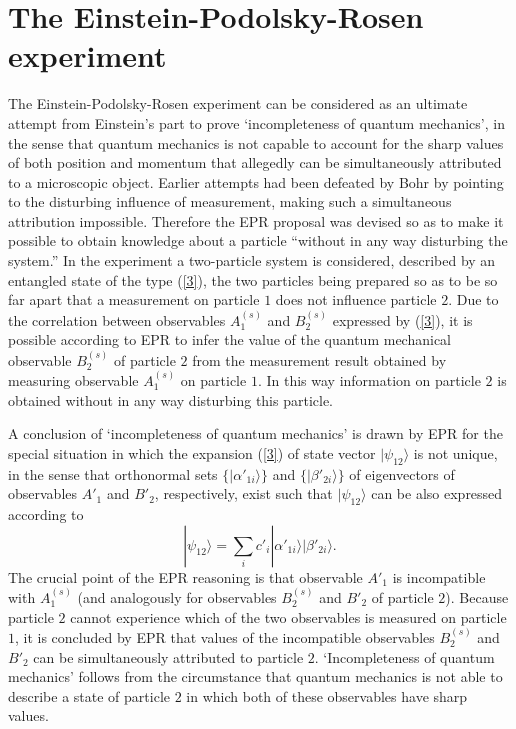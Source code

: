 \documentclass[12pt]{article}
\begin{document}
\section{The Einstein-Podolsky-Rosen experiment} \label{sec2.4}
The Einstein-Podolsky-Rosen experiment \cite{EPR} can be
considered as an ultimate attempt from Einstein's part to prove
`incompleteness of quantum mechanics', in the sense that quantum
mechanics is not capable to account for the sharp values of both
position and momentum that allegedly can be simultaneously
attributed to a microscopic object. Earlier attempts had been
defeated by Bohr by pointing to the disturbing influence of
measurement, making such a simultaneous attribution impossible.
Therefore the EPR proposal was devised so as to make it possible
to obtain knowledge about a particle ``without in any way
disturbing the system.'' In the experiment a two-particle system
is considered, described by an entangled state of the type
(\ref{3}), the two particles being prepared so as to be so far
apart that a measurement on particle $1$ does not influence
particle $2$. Due to the correlation between observables
$A^{(s)}_1$ and $B^{(s)}_2$ expressed by (\ref{3}), it is possible
according to EPR to infer the value of the quantum mechanical
observable $B^{(s)}_2$ of particle $2$ from the measurement result
obtained by measuring observable $A^{(s)}_1$ on particle $1$. In
this way information on particle $2$ is obtained without in any
way disturbing this particle.

A conclusion of `incompleteness of quantum mechanics' is drawn by
EPR for the special situation in which the expansion (\ref{3}) of
state vector $| \psi_{12} \rangle$ is not unique, in the sense
that orthonormal sets $\{|\alpha'_{1i}\rangle\}$ and
$\{|\beta'_{2i}\rangle\}$ of eigenvectors of observables $A'_1$
and $B'_2$, respectively, exist such that $| \psi_{12} \rangle$
can be also expressed according to
\[| \psi_{12} \rangle = \sum_i c'_i | \alpha'_{1i} \rangle |
\beta'_{2i} \rangle.\] The crucial point of the EPR reasoning is
that observable $A'_1$ is incompatible with $A^{(s)}_1$ (and
analogously for observables $B^{(s)}_2$ and $B'_2$ of particle
$2$). Because particle $2$ cannot experience which of the two
observables is measured on particle $1$, it is concluded by EPR
that values of the incompatible observables $B^{(s)}_2$ and $B'_2$
can be simultaneously attributed to particle $2$. `Incompleteness
of quantum mechanics' follows from the circumstance that quantum
mechanics is not able to describe a state of particle $2$ in which
both of these observables have sharp values.
\end{document}
